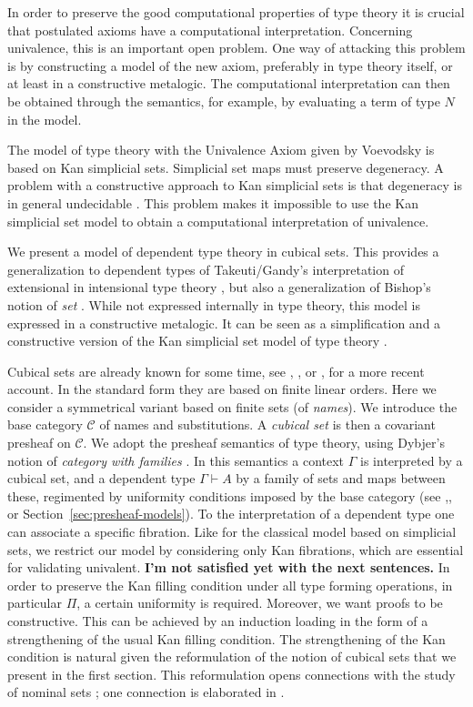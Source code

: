 \documentclass[10pt,a4paper]{article}
\newcommand{\CC}{{\mathcal C}}
\newcommand{\nat}{{N}}
\begin{document}
In order to preserve the good computational properties of type theory it is
crucial that postulated axioms have a computational interpretation.
Concerning univalence, this is an important open problem.
One way of attacking this problem is by constructing a model of the new
axiom, preferably in type theory itself, or at least in a constructive metalogic.
The computational interpretation can then be obtained through the semantics,
for example, by evaluating a term of type $\nat$ in the model.

The model of type theory with the Univalence Axiom given by Voevodsky
\cite{Voevodsky} is based on Kan simplicial sets.
Simplicial set maps must preserve degeneracy.
A problem with a constructive approach to
Kan simplicial sets is that degeneracy is in general undecidable \cite{BC}.
This problem makes it impossible to use the Kan simplicial set model
to obtain a computational interpretation of univalence.

We present a model of dependent type theory in cubical sets.
This provides a generalization to dependent types
of Takeuti/Gandy's interpretation of extensional in intensional type theory \cite{Gandy}, but also
a generalization of Bishop's notion of {\em set} \cite{Bishop}.
While not expressed internally in type theory, this model is expressed in a constructive metalogic.
It can be seen as a simplification and a constructive version of the
Kan simplicial set model of type theory \cite{Voevodsky}.

Cubical sets are already known for some time, see \cite{Serre}, \cite{Kan},
or \cite{Crans}, \cite{Williamson} for a more recent account.
In the standard form they are based on finite linear orders.
Here we consider a symmetrical variant based on finite sets (of \emph{names}).
We introduce the base category $\CC$ of names and substitutions.
A \emph{cubical set} is then a covariant presheaf on $\CC$.
We adopt the presheaf semantics of type theory,
using Dybjer's notion of \emph{category with families} \cite{Dybjer}.
In this semantics a context $\Gamma$ is interpreted by a cubical set,
and a dependent type $\Gamma\vdash A$ by a family of sets and maps between these,
regimented by uniformity conditions imposed by the base category
(see \cite{Dybjer},\cite{Hofmann}, or Section~\ref{sec:presheaf-models}).
To the interpretation of a dependent type one can associate a specific fibration.
Like for the classical model based on simplicial sets,
we restrict our model by considering only Kan fibrations,
which are essential for validating univalent.
{\bf I'm not satisfied yet with the next sentences.}
In order to preserve the Kan filling condition under all type forming
operations, in particular $\Pi$, a certain uniformity is required.
Moreover, we want proofs to be constructive. This can be achieved
by an induction loading in the form of
a strengthening of the usual Kan filling condition. 
The strengthening of the Kan condition is natural given the reformulation of the notion of cubical sets
that we present in the first section. This reformulation opens connections with the study of nominal
sets \cite{pitts}; one connection is elaborated in \cite{Pitts}.
\end{document}
